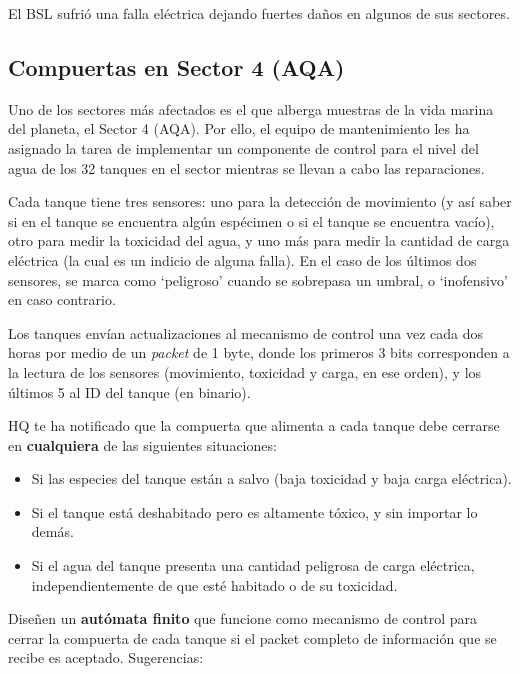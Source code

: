 \documentclass[8pt, onside]{article}
\begin{document}
El BSL sufrió una falla eléctrica dejando fuertes daños en algunos de sus sectores.

\subsection*{Compuertas en Sector 4 (AQA)}

Uno de los sectores más afectados es el que alberga muestras de la vida marina del planeta, el Sector 4 (AQA). Por ello, el equipo de mantenimiento les ha asignado la tarea de implementar un componente de control para el nivel del agua de los 32 tanques en el sector mientras se llevan a cabo las reparaciones.

Cada tanque tiene tres sensores: uno para la detección de movimiento (y así saber si en el tanque se encuentra algún espécimen o si el tanque se encuentra vacío), otro para medir la toxicidad del agua, y uno más para medir la cantidad de carga eléctrica (la cual es un indicio de alguna falla).
En el caso de los últimos dos sensores, se marca como `peligroso' cuando se sobrepasa un umbral, o `inofensivo' en caso contrario.

Los tanques envían actualizaciones al mecanismo de control una vez cada dos horas por medio de un \textit{packet} de 1 byte, donde los primeros 3 bits corresponden a la lectura de los sensores (movimiento, toxicidad y carga, en ese orden), y los últimos 5 al ID del tanque (en binario).

HQ te ha notificado que la compuerta que alimenta a cada tanque debe cerrarse en \textbf{cualquiera} de las siguientes situaciones:

\begin{itemize}
    \itemsep0em
    \item Si las especies del tanque están a salvo (baja toxicidad y baja carga eléctrica).
    \item Si el tanque está deshabitado pero es altamente tóxico, y sin importar lo demás.
    \item Si el agua del tanque presenta una cantidad peligrosa de carga eléctrica, independientemente de que esté habitado o de su toxicidad.
\end{itemize}

\pagebreak

Diseñen un \textbf{autómata finito} que funcione como mecanismo de control para cerrar la compuerta de cada tanque si el packet completo de información que se recibe es aceptado. Sugerencias:
\end{document}
